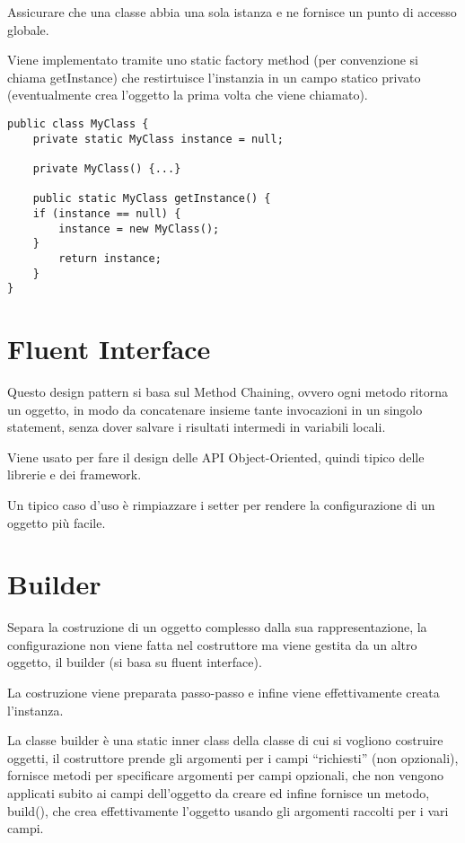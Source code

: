 Assicurare che una classe abbia una sola istanza e ne fornisce un punto di accesso globale.

Viene implementato tramite uno static factory method (per convenzione si chiama getInstance) che restirtuisce l'instanzia in un campo statico privato 
(eventualmente crea l'oggetto la prima volta che viene chiamato).

\begin{lstlisting}
public class MyClass {
    private static MyClass instance = null;
    
    private MyClass() {...}

    public static MyClass getInstance() {
    if (instance == null) {
        instance = new MyClass();
    }
        return instance;
    }
}
\end{lstlisting}

\section{Fluent Interface}

Questo design pattern si basa sul Method Chaining, ovvero ogni metodo ritorna un oggetto, in modo da concatenare insieme tante invocazioni in un singolo statement, 
senza dover salvare i risultati intermedi in variabili locali.

Viene usato per fare il design delle API Object-Oriented, quindi tipico delle librerie e dei framework.

Un tipico caso d’uso è rimpiazzare i setter per rendere la configurazione di un oggetto più facile.

\section{Builder}

Separa la costruzione di un oggetto complesso dalla sua rappresentazione, la configurazione non viene fatta nel costruttore ma viene gestita da un altro oggetto, 
il builder (si basa su fluent interface).

La costruzione viene preparata passo-passo e infine viene effettivamente creata l’instanza.

La classe builder è una static inner class della classe di cui si vogliono costruire oggetti, il costruttore prende gli argomenti per i campi “richiesti” 
(non opzionali), fornisce metodi per specificare argomenti per campi opzionali, che non vengono applicati subito ai campi dell’oggetto da creare ed infine fornisce un 
metodo, build(), che crea effettivamente l’oggetto usando gli argomenti raccolti per i vari campi.

